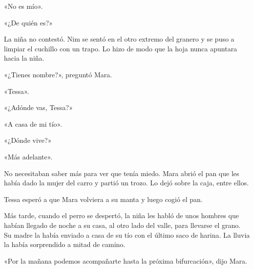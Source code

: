 \documentclass[10pt,a4paper]{article}
\begin{document}
«No es mío».

«¿De quién es?»

La niña no contestó. Nim se sentó en el otro extremo del granero y se puso a limpiar el cuchillo con un trapo. Lo hizo de modo que la hoja nunca apuntara hacia la niña.

«¿Tienes nombre?», preguntó Mara.

«Tessa».

«¿Adónde vas, Tessa?»

«A casa de mi tío».

«¿Dónde vive?»

«Más adelante».

No necesitaban saber más para ver que tenía miedo. Mara abrió el pan que les había dado la mujer del carro y partió un trozo. Lo dejó sobre la caja, entre ellos.

Tessa esperó a que Mara volviera a su manta y luego cogió el pan.

Más tarde, cuando el perro se despertó, la niña les habló de unos hombres que habían llegado de noche a su casa, al otro lado del valle, para llevarse el grano. Su madre la había enviado a casa de su tío con el último saco de harina. La lluvia la había sorprendido a mitad de camino.

«Por la mañana podemos acompañarte hasta la próxima bifurcación», dijo Mara.
\end{document}
